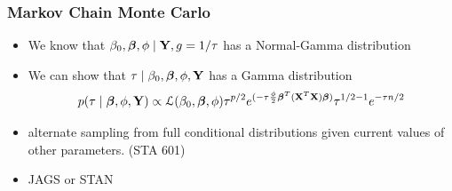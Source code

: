 \documentclass[handout]{beamer}\usepackage[]{graphicx}\usepackage[]{color}
\begin{document}
\begin{frame}[t] \frametitle{Markov Chain Monte Carlo}
\begin{itemize}
\item We know that $\beta_0, \boldsymbol{\beta}, \phi \mid \mathbf{Y}, g=1/\tau$ has a Normal-Gamma distribution  \pause
\item We can show that $\tau \mid \beta_0,\boldsymbol{\beta}, \phi, \mathbf{Y}$ has a Gamma distribution \pause
$$p(\tau \mid \boldsymbol{\beta}, \phi, \mathbf{Y}) \propto {\cal{L}}(\beta_0,\boldsymbol{\beta}, \phi)
\tau^{p/2} e^{( - \tau \frac{\phi}{2} \boldsymbol{\beta}^T (\mathbf{X}^T\mathbf{X}) \boldsymbol{\beta})}
\tau^{1/2 - 1} e^{ - \tau n/2}$$ \pause
\item alternate sampling from full conditional distributions given current values of other parameters.  (STA 601) \pause
\item JAGS or STAN
\end{itemize}
\end{frame}
\end{document}
